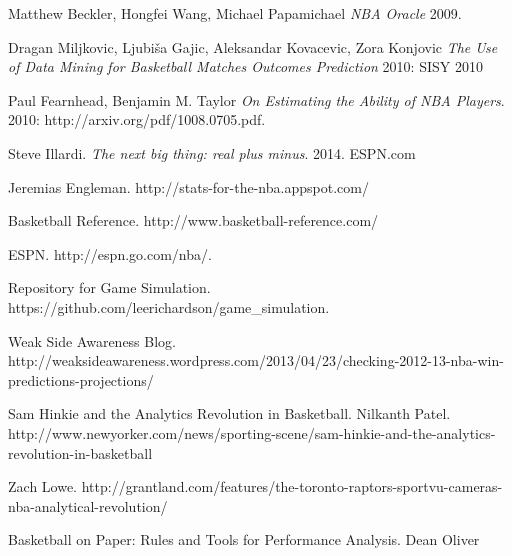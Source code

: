 \documentclass{article} %
\begin{document}
\begin{thebibliography}{1}

   Matthew Beckler, Hongfei Wang, Michael Papamichael {\em NBA Oracle} 2009.

   Dragan Miljkovic, Ljubiša Gajic, Aleksandar Kovacevic, Zora Konjovic {\em The Use of Data Mining for Basketball Matches Outcomes Prediction} 2010: SISY 2010

   Paul Fearnhead, Benjamin M. Taylor {\em On Estimating the Ability of NBA Players}. 2010: http://arxiv.org/pdf/1008.0705.pdf.

   Steve Illardi. {\em The next big thing: real plus minus}. 2014. ESPN.com

   Jeremias Engleman. http://stats-for-the-nba.appspot.com/

   Basketball Reference. http://www.basketball-reference.com/

   ESPN. http://espn.go.com/nba/.

   Repository for Game Simulation. https://github.com/leerichardson/game\_simulation.

   Weak Side Awareness Blog. http://weaksideawareness.wordpress.com/2013/04/23/checking-2012-13-nba-win-predictions-projections/

   Sam Hinkie and the Analytics Revolution in Basketball. Nilkanth Patel. http://www.newyorker.com/news/sporting-scene/sam-hinkie-and-the-analytics-revolution-in-basketball

   Zach Lowe. http://grantland.com/features/the-toronto-raptors-sportvu-cameras-nba-analytical-revolution/

   Basketball on Paper: Rules and Tools for Performance Analysis. Dean Oliver

  \end{thebibliography}
	
\end{document}
